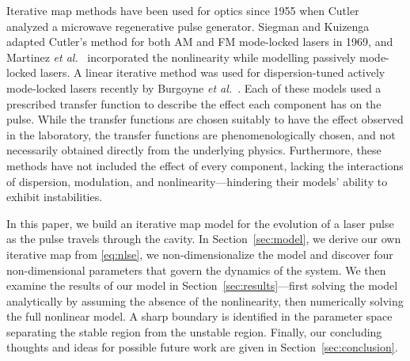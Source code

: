 \documentclass[9pt,twocolumn,twoside]{osajnl}
\begin{document}
Iterative map methods have been used for optics since 1955 when Cutler~\cite{cutler1955} analyzed a microwave regenerative pulse generator. Siegman and Kuizenga~\cite{kuizenga1970a, kuizenga1970b, kuizenga1970, siegman1969} adapted Cutler's method for both AM and FM mode-locked lasers in 1969, and Martinez \emph{et al.}~\cite{martinez1984, martinez1985} incorporated the nonlinearity while modelling passively mode-locked lasers. A linear iterative method was used for dispersion-tuned actively mode-locked lasers recently by Burgoyne \emph{et al.}~\cite{burgoyne2014}. Each of these models used a prescribed transfer function to describe the effect each component has on the pulse. While the transfer functions are chosen suitably to have the effect observed in the laboratory, the transfer functions are phenomenologically chosen, and not necessarily obtained directly from the underlying physics. Furthermore, these methods have not included the effect of every component, lacking the interactions of dispersion, modulation, and nonlinearity---hindering their models' ability to exhibit instabilities.

In this paper, we build an iterative map model for the evolution of a laser pulse as the pulse travels through the cavity. In Section~\ref{sec:model}, we derive our own iterative map from \eqref{eq:nlse}, we non-dimensionalize the model and discover four non-dimensional parameters that govern the dynamics of the system. We then examine the results of our model in Section~\ref{sec:results}---first solving the model analytically by assuming the absence of the nonlinearity, then numerically solving the full nonlinear model. A sharp boundary is identified in the parameter space separating the stable region from the unstable region. Finally, our concluding thoughts and ideas for possible future work are given in Section~\ref{sec:conclusion}.
\end{document}
